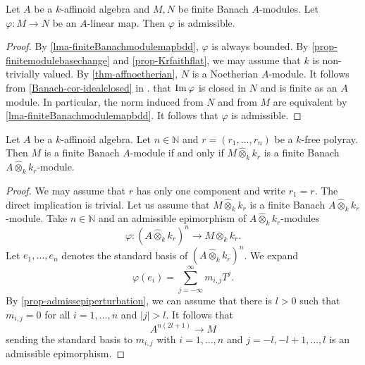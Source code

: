 \begin{proposition}\label{prop-finitemodulemapadmi}
    Let $A$ be a $k$-affinoid algebra and $M,N$ be finite Banach $A$-modules. Let $\varphi:M\rightarrow N$ be an $A$-linear map. Then $\varphi$ is admissible.
\end{proposition}
\begin{proof}
    By \cref{lma-finiteBanachmodulemapbdd}, $\varphi$ is always bounded.
    By \cref{prop-finitemodulebasechange} and \cref{prop-Krfaithflat}, we may assume that $k$ is non-trivially valued. By \cref{thm-affnoetherian}, $N$ is a Noetherian $A$-module. It follows from \cref{Banach-cor-idealclosed} in . that $\operatorname{Im} \varphi$ is closed in $N$ and is finite as an $A$ module. In particular, the norm induced from $N$ and from $M$ are equivalent by \cref{lma-finiteBanachmodulemapbdd}. It follows that $\varphi$ is admissible.
\end{proof}

\begin{proposition}\label{prop-finitenessdescent1}
    Let $A$ be a $k$-affinoid algebra. Let $n\in \mathbb{N}$ and $r=(r_1,\ldots,r_n)$ be a $k$-free polyray. Then $M$ is a finite Banach $A$-module if and only if $M\hat{\otimes}_k k_r$ is a finite Banach $A\hat{\otimes}_k k_r$-module.
\end{proposition}
\begin{proof}
    We may assume that $r$ has only one component and write $r_1=r$. The direct implication is trivial. Let us assume that $M\hat{\otimes}_k k_r$ is a finite Banach $A\hat{\otimes}_k k_r$-module. Take $n\in \mathbb{N}$ and an admissible epimorphism of $A\hat{\otimes}_k k_r$-modules
    \[
        \varphi:  (A\hat{\otimes}_k k_r)^n\rightarrow M\hat{\otimes}_k k_r.
    \]
    Let $e_1,\ldots,e_n$ denotes the standard basis of $(A\hat{\otimes}_k k_r)^n$. We expand
    \[
        \varphi(e_i)=\sum_{j=-\infty}^{\infty} m_{i,j}T^j.  
    \]
    By \cref{prop-admissepiperturbation}, we can assume that there is $l>0$ such that $m_{i,j}=0$ for all $i=1,\ldots,n$ and $|j|>l$. It follows that 
    \[
        A^{n(2l+1)}\rightarrow M  
    \]
    sending the standard basis to $m_{i,j}$ with $i=1,\ldots,n$ and $j=-l,-l+1,\ldots,l$ is an admissible epimorphism.
\end{proof}


